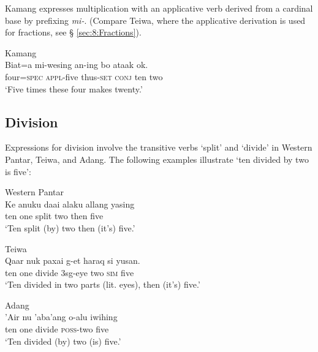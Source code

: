  

Kamang expresses multiplication with an applicative verb derived from a cardinal base by prefixing \textit{mi-}. (Compare Teiwa, where the applicative derivation is used for fractions, see {\S} \ref{sec:8:Fractions}). 




\ea%
\label{bkm:Ref358043179}
{\upshape Kamang}\\
\gll   Biat=a  mi-wesing  an-ing  bo  ataak   ok.  \\  
    four=\textsc{spec}  \textsc{appl-}five  thus\textsc{-set}  \textsc{conj} ten  two   \\
\glt  `Five times these four makes twenty.'
\z


\subsection{Division}
\label{sec:8:Division}
Expressions for division involve the transitive verbs `split' and `divide' in Western Pantar, Teiwa, and Adang. The following examples illustrate `ten divided by two is five': 


\ea%
\label{bkm:Ref342664493}
{\upshape Western  Pantar}\\
 
\gll   Ke anuku  daai  alaku  allang  yasing\\  
    ten one  split  two  then  five \\
\glt `Ten split (by) two then (it's) five.'
\z



 

 


\ea
\label{ex:8:1246}
{\upshape Teiwa}\\  
 \gll Qaar  nuk  paxai  g-et  haraq  si  yusan.   \\
  ten  one  divide  3sg-eye  two  \textsc{sim}  five   \\
 \glt `Ten divided in two parts (lit. eyes), then (it's) five.'
\z
 

\ea%
\label{bkm:Ref342664505}
{\upshape Adang}\\
\gll  'Air nu  'aba'ang  o-alu  iwihing\\  
    ten one  divide  \textsc{poss-}two  five \\
\glt `Ten divided (by) two (is) five.'  
\z

 

